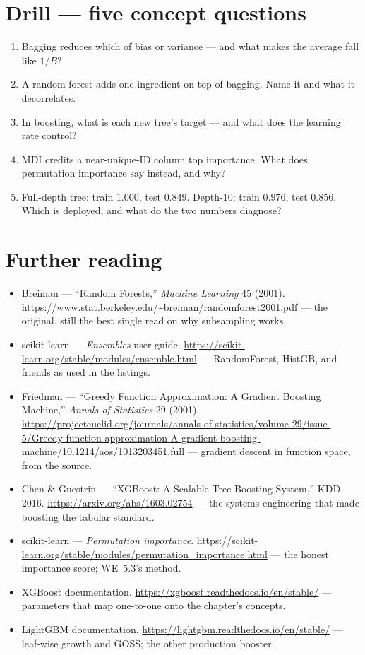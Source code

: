 \section{Drill --- five concept questions}

\begin{enumerate}
\item Bagging reduces which of bias or variance --- and what makes the
  average fall like $1/B$?
\item A random forest adds one ingredient on top of bagging. Name it and
  what it decorrelates.
\item In boosting, what is each new tree's target --- and what does the
  learning rate control?
\item MDI credits a near-unique-ID column top importance. What does
  permutation importance say instead, and why?
\item Full-depth tree: train $1.000$, test $0.849$. Depth-10: train
  $0.976$, test $0.856$. Which is deployed, and what do the two numbers
  diagnose?
\end{enumerate}

\section*{Further reading}
\begin{itemize}
\item Breiman --- ``Random Forests,'' \emph{Machine Learning} 45 (2001).
  \url{https://www.stat.berkeley.edu/~breiman/randomforest2001.pdf} ---
  the original, still the best single read on why subsampling works.
\item scikit-learn --- \emph{Ensembles} user guide.
  \url{https://scikit-learn.org/stable/modules/ensemble.html} ---
  RandomForest, HistGB, and friends as used in the listings.
\item Friedman --- ``Greedy Function Approximation: A Gradient Boosting
  Machine,'' \emph{Annals of Statistics} 29 (2001).
  \url{https://projecteuclid.org/journals/annals-of-statistics/volume-29/issue-5/Greedy-function-approximation-A-gradient-boosting-machine/10.1214/aos/1013203451.full}
  --- gradient descent in function space, from the source.
\item Chen \& Guestrin --- ``XGBoost: A Scalable Tree Boosting System,''
  KDD 2016. \url{https://arxiv.org/abs/1603.02754} --- the systems
  engineering that made boosting the tabular standard.
\item scikit-learn --- \emph{Permutation importance}.
  \url{https://scikit-learn.org/stable/modules/permutation_importance.html}
  --- the honest importance score; WE~5.3's method.
\item XGBoost documentation. \url{https://xgboost.readthedocs.io/en/stable/}
  --- parameters that map one-to-one onto the chapter's concepts.
\item LightGBM documentation. \url{https://lightgbm.readthedocs.io/en/stable/}
  --- leaf-wise growth and GOSS; the other production booster.
\end{itemize}

